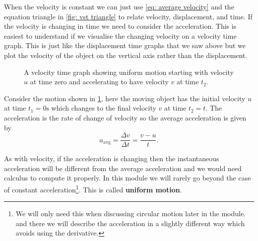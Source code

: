 \documentclass[a4paper,12pt]{book}
\begin{document}
When the velocity is constant we can just use \cref{eq: average velocity} and the equation triangle in \cref{fig: vst triangle} to relate velocity, displacement, and time. If the velocity is changing in time we need to consider the acceleration. This is easiest to understand if we visualise the changing velocity on a velocity time graph. This is just like the displacement time graphs that we saw above but we plot the velocity of the object on the vertical axis rather than the displacement.\\

\begin{figure}[ht]
    \centering
    \caption{A velocity time graph showing uniform motion starting with velocity $u$ at time zero and accelerating to have velocity $v$ at time $t_{2}$.}
    \label{fig: velocity time graph 1}
\end{figure}

Consider the motion shown in \cref{fig: velocity time graph 1}, here the moving object has the initial velocity $u$ at time $t_{1}=0\text{s}$ which changes to the final velocity $v$ at time $t_{2}=t$. The acceleration is the rate of change of velocity so the average acceleration is given by
\begin{equation}
    a_{\text{avg}}=\frac{\Delta v}{\Delta t}=\frac{v-u}{t}.
    \label{eq: average acceleration}
\end{equation}

As with velocity, if the acceleration is changing then the instantaneous acceleration will be different from the average acceleration and we would need calculus to compute it properly. In this module we will rarely go beyond the case of constant acceleration\footnote{We will only need this when discussing circular motion later in the module. and there we will describe the acceleration in a slightly different way which avoids using the derivative.}. This is called \textbf{uniform motion}.\\
\end{document}
